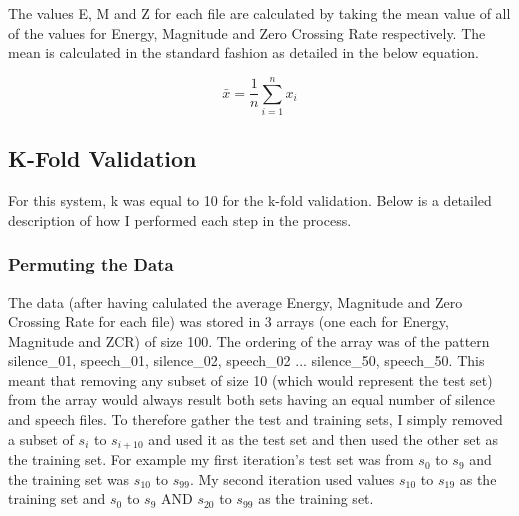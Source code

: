 \documentclass[12pt]{article} %
\begin{document}
The values E, M and Z for each file are calculated by taking the mean value of all of the values
for Energy, Magnitude and Zero Crossing Rate respectively. The mean is calculated in the standard
fashion as detailed in the below equation.

\[
\bar{x}= \frac{1}{n}\sum_{i=1}^{n}x_i
\] 
\subsection{K-Fold Validation}

For this system, k was equal to 10 for the k-fold validation. Below is a detailed description of
how I performed each step in the process.

\subsubsection{Permuting the Data}
The data (after having calulated the average Energy, Magnitude and Zero Crossing Rate for each
file) was stored in 3 arrays (one each for Energy, Magnitude and ZCR) of size 100. The ordering of
the array was of the pattern 
silence\_01, speech\_01, silence\_02, speech\_02 ... silence\_50, speech\_50. This meant that
removing any subset of size 10 (which would represent the test set) from the array would always
result both sets having an equal number of silence and speech files. To therefore gather the test
and training sets, I simply removed a subset of $s_i$ to $s_{i+10}$ and used it as the test set and
then used the other set as the training set. For example my first iteration's test set was from
$s_0$ to $s_9$ and the training set was $s_{10}$ to $s_{99}$. My second iteration used values
$s_{10}$ to $s_19$ as the training set and $s_0$ to $s_9$ AND $s_{20}$ to $s_{99}$ as the training
set. 
\end{document}
